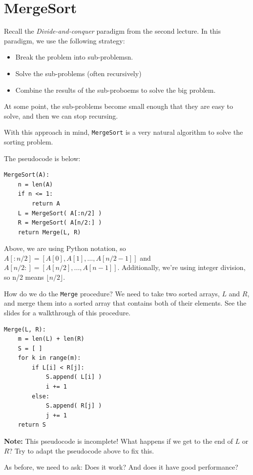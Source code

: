 \documentclass [12pt]{article}
\begin{document}
\section{MergeSort}
Recall the \textit{Divide-and-conquer} paradigm from the second lecture. In this paradigm, we use the following strategy:

\begin{itemize}
    \item Break the problem into sub-problemsn.
    \item Solve the sub-problems (often recursively)
    \item Combine the results of the sub-proboems to solve the big problem.
\end{itemize}

At some point, the sub-problems become small enough that they are easy to solve, and then we can stop recursing.

With this approach in mind, \texttt{MergeSort} is a very natural algorithm to solve the sorting problem.

The pseudocode is below:

\begin{verbatim}
MergeSort(A):
    n = len(A)
    if n <= 1:
        return A
    L = MergeSort( A[:n/2] )
    R = MergeSort( A[n/2:] )
    return Merge(L, R)
\end{verbatim}

Above, we are using Python notation, so $A[: n/2] = [A[0], A[1], \dots , A[n/2 - 1]]$ and $A[n/2 :] = [A[n/2], . . . , A[n - 1]]$. Additionally, we're using integer division, so n/2 means $\lfloor n/2 \rfloor$.

How do we do the \texttt{Merge} procedure? We need to take two sorted arrays, $L$ and $R$, and merge them into a sorted array that contains both of their elements. See the slides for a walkthrough of this procedure.

\begin{verbatim}
Merge(L, R):
    m = len(L) + len(R)
    S = [ ]
    for k in range(m):
        if L[i] < R[j]:
            S.append( L[i] )
            i += 1
        else:
            S.append( R[j] )
            j += 1
    return S
\end{verbatim}

\textbf{Note:} This pseudocode is incomplete! What happens if we get to the end of $L$ or $R$? Try to adapt the pseudocode above to fix this.

As before, we need to ask: Does it work? And does it have good performance?
\end{document}
